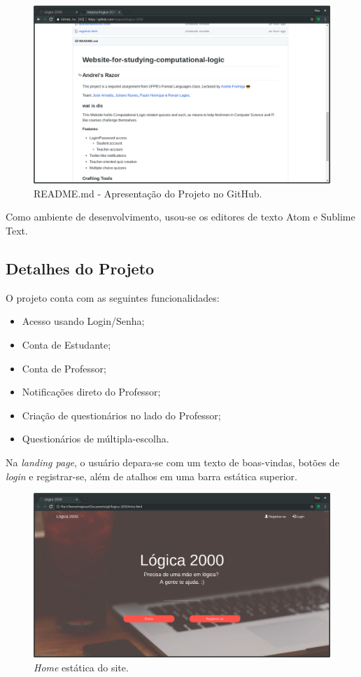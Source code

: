 \documentclass[11pt, a4paper]{article}
\begin{document}
				\begin{figure}[!h]
					\centering
					\includegraphics[scale=.2]{print1-1.png}
					\caption{README.md - Apresentação do Projeto no GitHub.}
				\end{figure}

			Como ambiente de desenvolvimento, usou-se os editores de texto Atom e Sublime Text.

			\pagebreak

		\subsection{Detalhes do Projeto}

			O projeto conta com as seguintes funcionalidades:

			\begin{itemize}
				\item Acesso usando Login/Senha;
				\item Conta de Estudante;
				\item Conta de Professor;
				\item Notificações direto do Professor;
				\item Criação de questionários no lado do Professor;
				\item Questionários de múltipla-escolha.
			\end{itemize}

			Na \emph{landing page}, o usuário depara-se com um texto de boas-vindas, botões de \emph{login} e registrar-se, além de atalhos em uma barra estática superior.

				\begin{figure}[!h]
					\centering
					\includegraphics[scale=.3]{print2.png}
					\caption{\emph{Home} estática do site.}
				\end{figure}
\end{document}

